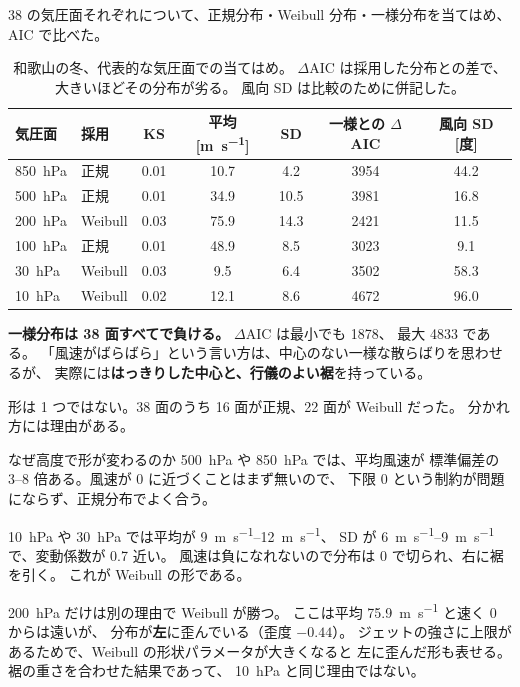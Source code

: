 

38 の気圧面それぞれについて、正規分布・Weibull 分布・一様分布を当てはめ、
AIC で比べた。

\begin{table}[H]
\centering
\caption{和歌山の冬、代表的な気圧面での当てはめ。
$\Delta$AIC は採用した分布との差で、大きいほどその分布が劣る。
風向 SD は比較のために併記した。}
\label{tab:winter-fit}
\begin{tabular}{@{}llS[table-format=1.2]S[table-format=2.1]S[table-format=2.1]S[table-format=4.0]S[table-format=2.1]@{}}
\toprule
気圧面 & 採用 & {KS} & {平均 [\si{\metre\per\second}]} & {SD}
       & {一様との $\Delta$AIC} & {風向 SD [度]} \\
\midrule
\SI{850}{\hecto\pascal} & 正規    & 0.01 & 10.7 & 4.2  & 3954 & 44.2 \\
\SI{500}{\hecto\pascal} & 正規    & 0.01 & 34.9 & 10.5 & 3981 & 16.8 \\
\SI{200}{\hecto\pascal} & Weibull & 0.03 & 75.9 & 14.3 & 2421 & 11.5 \\
\SI{100}{\hecto\pascal} & 正規    & 0.01 & 48.9 & 8.5  & 3023 & 9.1 \\
\SI{30}{\hecto\pascal}  & Weibull & 0.03 & 9.5  & 6.4  & 3502 & 58.3 \\
\SI{10}{\hecto\pascal}  & Weibull & 0.02 & 12.1 & 8.6  & 4672 & 96.0 \\
\bottomrule
\end{tabular}
\end{table}

\textbf{一様分布は 38 面すべてで負ける。} $\Delta$AIC は最小でも \num{1878}、
最大 \num{4833} である。
「風速がばらばら」という言い方は、中心のない一様な散らばりを思わせるが、
実際には\textbf{はっきりした中心と、行儀のよい裾}を持っている。

形は 1 つではない。38 面のうち 16 面が正規、22 面が Weibull だった。
分かれ方には理由がある。

\begin{whybox}{なぜ高度で形が変わるのか}
\SI{500}{\hecto\pascal} や \SI{850}{\hecto\pascal} では、平均風速が
標準偏差の 3--8 倍ある。風速が 0 に近づくことはまず無いので、
下限 0 という制約が問題にならず、正規分布でよく合う。

\SI{10}{\hecto\pascal} や \SI{30}{\hecto\pascal} では平均が \SIrange{9}{12}{\metre\per\second}、
SD が \SIrange{6}{9}{\metre\per\second} で、変動係数が 0.7 近い。
風速は負になれないので分布は 0 で切られ、右に裾を引く。
これが Weibull の形である。

\SI{200}{\hecto\pascal} だけは別の理由で Weibull が勝つ。
ここは平均 \SI{75.9}{\metre\per\second} と速く 0 からは遠いが、
分布が\textbf{左}に歪んでいる（歪度 $-0.44$）。
ジェットの強さに上限があるためで、Weibull の形状パラメータが大きくなると
左に歪んだ形も表せる。裾の重さを合わせた結果であって、
\SI{10}{\hecto\pascal} と同じ理由ではない。
\end{whybox}

